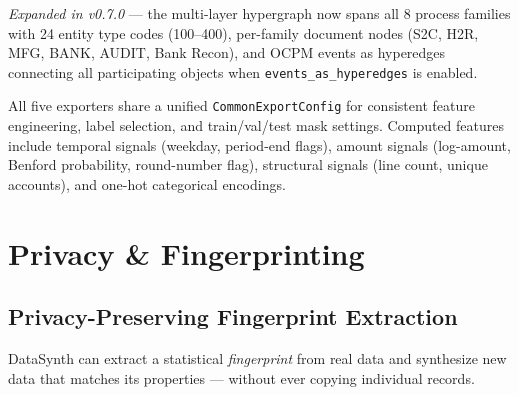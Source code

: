 \documentclass[11pt,a4paper]{article}
\begin{document}
\noindent
\textit{Expanded in v0.7.0} --- the multi-layer hypergraph now spans all 8
process families with 24 entity type codes (100--400), per-family document
nodes (S2C, H2R, MFG, BANK, AUDIT, Bank Recon), and OCPM events as
hyperedges connecting all participating objects when
\texttt{events\_as\_hyperedges} is enabled.

\noindent
All five exporters share a unified \texttt{CommonExportConfig} for consistent
feature engineering, label selection, and train/val/test mask settings.
Computed features include temporal signals (weekday, period-end flags),
amount signals (log-amount, Benford probability, round-number flag),
structural signals (line count, unique accounts), and one-hot categorical
encodings.

\newpage
\section{Privacy \& Fingerprinting}

\subsection{Privacy-Preserving Fingerprint Extraction}

DataSynth can extract a statistical \emph{fingerprint} from real data and
synthesize new data that matches its properties --- without ever copying
individual records.

\begin{center}
\end{center}
\end{document}
